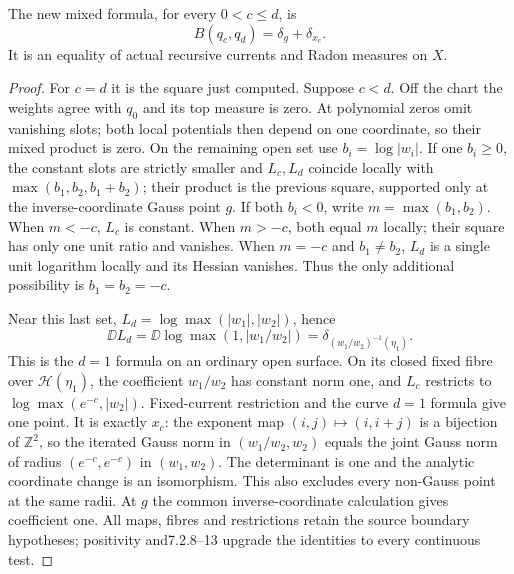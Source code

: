 \begin{lemma}\label{branch:mixed}
The new mixed formula, for every $0<c\le d$, is
\[
 B(q_c,q_d)=\delta_g+\delta_{x_c}.
\]
It is an equality of actual recursive currents and Radon measures on $X$.
\end{lemma}
\begin{proof}
For $c=d$ it is the square just computed. Suppose $c<d$.
Off the chart the weights agree with $q_0$ and its top measure is zero.
At polynomial zeros omit vanishing slots; both local potentials then
depend on one coordinate, so their mixed product is zero.
On the remaining open set use $b_i=\log|w_i|$.
If one $b_i\ge0$, the constant slots are strictly smaller and $L_c,L_d$
coincide locally with $\max(b_1,b_2,b_1+b_2)$; their product is the
previous square, supported only at the inverse-coordinate Gauss point $g$.
If both $b_i<0$, write $m=\max(b_1,b_2)$. When $m<-c$, $L_c$ is constant.
When $m>-c$, both equal $m$ locally; their square has only one unit ratio
and vanishes. When $m=-c$ and $b_1\ne b_2$, $L_d$ is a single unit
logarithm locally and its Hessian vanishes. Thus the only additional
possibility is $b_1=b_2=-c$.

Near this last set, $L_d=\log\max(|w_1|,|w_2|)$, hence
\[
 \DD L_d=\DD\log\max(1,|w_1/w_2|)
           =\delta_{(w_1/w_2)^{-1}(\eta_1)}.
\]
This is the $d=1$ formula on an ordinary open surface. On its closed fixed
fibre over $\mathscr H(\eta_1)$, the coefficient $w_1/w_2$ has constant
norm one, and $L_c$ restricts to $\log\max(e^{-c},|w_2|)$.
Fixed-current restriction and the curve $d=1$ formula give one point.
It is exactly $x_c$: the exponent map $(i,j)\mapsto(i,i+j)$ is a bijection
of $\mathbb Z^2$, so the iterated Gauss norm in $(w_1/w_2,w_2)$ equals
the joint Gauss norm of radius $(e^{-c},e^{-c})$ in $(w_1,w_2)$.
The determinant is one and the analytic coordinate change is an
isomorphism. This also excludes every non-Gauss point at the same radii.
At $g$ the common inverse-coordinate calculation gives coefficient one.
All maps, fibres and restrictions retain the source boundary hypotheses;
positivity and7.2.8--13 upgrade the identities to every continuous test.
\end{proof}

